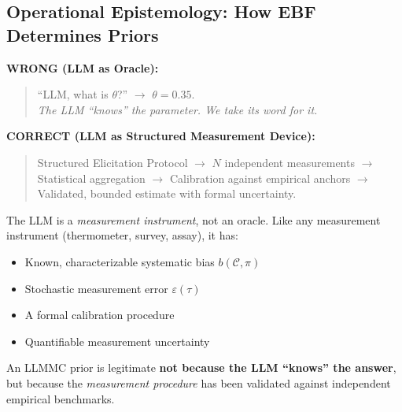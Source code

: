 
\subsection{Operational Epistemology: How EBF Determines Priors}
\label{sec:AN-epistemology}

\begin{tcolorbox}[colback=red!5!white, colframe=red!75!black,
    title=\textbf{The Core Distinction: Oracle vs.\ Measurement Device}]

\textbf{WRONG (LLM as Oracle):}
\begin{quote}
``LLM, what is $\theta$?'' $\to$ $\theta = 0.35$. \\
\textit{The LLM ``knows'' the parameter. We take its word for it.}
\end{quote}

\textbf{CORRECT (LLM as Structured Measurement Device):}
\begin{quote}
Structured Elicitation Protocol $\to$ $N$ independent measurements $\to$ \\
Statistical aggregation $\to$ Calibration against empirical anchors $\to$ \\
Validated, bounded estimate with formal uncertainty.
\end{quote}

The LLM is a \textit{measurement instrument}, not an oracle. Like any measurement
instrument (thermometer, survey, assay), it has:
\begin{itemize}[nosep]
    \item Known, characterizable systematic bias $b(\mathcal{C}, \pi)$
    \item Stochastic measurement error $\varepsilon(\tau)$
    \item A formal calibration procedure
    \item Quantifiable measurement uncertainty
\end{itemize}

An LLMMC prior is legitimate \textbf{not because the LLM ``knows'' the answer},
but because the \textit{measurement procedure} has been validated against
independent empirical benchmarks.

\end{tcolorbox}

